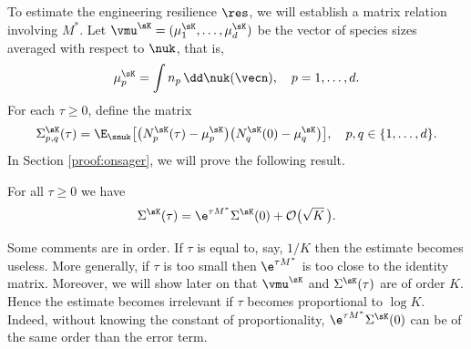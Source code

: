 To estimate the engineering resilience $\res$, we will establish a matrix relation involving $M^*$.
Let $\vmu^{\sK}=(\mu_1^{\sK},\ldots,\mu_d^{\sK})$ be the vector of species sizes averaged with respect to $\nuk$, that is,
\begin{equation}
\label{def-mup}
\mu_{p}^{\sK}=\int n_{p}\,\dd\nuk(\vecn),\quad p=1,\ldots,d.
\end{equation}
For each $\tau\geq 0$, define the matrix
\[
\Sigma^{\sK}_{p,q}(\tau)=
\E_{\snuk}\bigl[\bigl(N_{p}^{\sK}(\tau)-\mu_{p}^{\sK}\bigr)\bigl(N_{q}^{\sK}(0)-\mu_{q}^{\sK}\bigr)\bigr],\quad p,q \in \{1, \ldots, d\}.
\]
In Section \ref{proof:onsager}, we will prove the following result.
\begin{theorem}
\label{thm-onsager-relation}
For all $\tau\geq 0$ we have
\begin{equation}\label{onsager}
\Sigma^{\sK}(\tau)=\e^{\tau M^*}\Sigma^{\sK}(0)+\mathcal{O}\bigl(\sqrt{K}\,\bigr).
\end{equation}
\end{theorem}
Some comments are in order. If $\tau$ is equal to, say, $1/K$ then the estimate becomes useless. More generally, if $\tau$ is too small then
$\e^{\tau M^*}$ is too close to the identity matrix.
Moreover, we will show later on that $\vmu^{\sK}$ and $\Sigma^{\sK}(\tau)$ are of order $K$. Hence the estimate becomes irrelevant
if $\tau$ becomes proportional to $\log K$. Indeed, without knowing the constant of proportionality, $\e^{\tau M^*}\Sigma^{\sK}(0)$ can be of the same
order than the error term.

